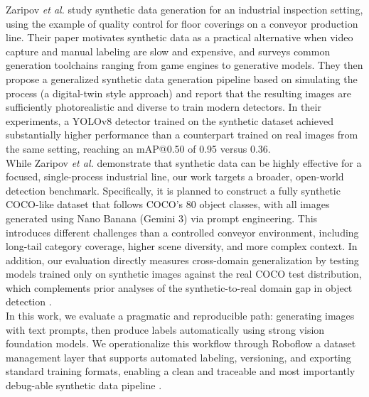 \documentclass[conference]{IEEEtran}
\begin{document}
Zaripov \textit{et al.} \cite{zaripov2025creation} study synthetic data generation for an industrial inspection setting, using the example of quality control for floor coverings on a conveyor production line. Their paper motivates synthetic data as a practical alternative when video capture and manual labeling are slow and expensive, and surveys common generation toolchains ranging from game engines to generative models. They then propose a generalized synthetic data generation pipeline based on simulating the process (a digital-twin style approach) and report that the resulting images are sufficiently photorealistic and diverse to train modern detectors. In their experiments, a YOLOv8 detector trained on the synthetic dataset achieved substantially higher performance than a counterpart trained on real images from the same setting, reaching an mAP@0.50 of 0.95 versus 0.36.\\

While Zaripov \textit{et al.} \cite{zaripov2025creation} demonstrate that synthetic data can be highly effective for a focused, single-process industrial line, our work targets a broader, open-world detection benchmark. Specifically, it is planned to construct a fully synthetic COCO-like dataset that follows COCO's 80 object classes, with all images generated using Nano Banana (Gemini 3) via prompt engineering. This introduces different challenges than a controlled conveyor environment, including long-tail category coverage, higher scene diversity, and more complex context. In addition, our evaluation directly measures cross-domain generalization by testing models trained only on synthetic images against the real COCO test distribution, which complements prior analyses of the synthetic-to-real domain gap in object detection \cite{ros2023domaingap,bay2025impactsyntheticdataobject}.\\


In this work, we evaluate a pragmatic and reproducible path: generating images with text prompts, then produce labels automatically using strong vision foundation models. We operationalize this workflow through Roboflow\citep{roboflow_autolabel,roboflow_export_data,roboflow_formats} a dataset management layer that supports automated labeling, versioning, and exporting standard training formats, enabling a clean and traceable and most importantly debug-able synthetic data pipeline \citep{roboflow_autolabel,roboflow_export_data,roboflow_formats}.\\
\end{document}
